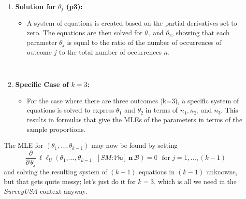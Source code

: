 \documentclass[12pt]{article}
\newcommand{\given}{\, | \,}
\renewcommand{\r}[1]{\text{#1}}
\begin{document}
\begin{itemize}
\begin{itemize}
\begin{itemize}
{\begin{enumerate}
    \begin{itemize}
        \item To find the MLEs, partial derivatives of the log-likelihood function with respect to each \( \theta_j \) are taken. This is done to find the points where the log-likelihood function is maximized.
        \item There is a constraint that all the probabilities \( \theta_j \) must sum to one. This constraint is incorporated into the optimization problem using a method such as Lagrange multipliers.
    \end{itemize}
    \\
    \item \textbf{Solution for \( \theta_j \) (p3):}
    \begin{itemize}
        \item A system of equations is created based on the partial derivatives set to zero. The equations are then solved for \( \theta_1 \) and \( \theta_2 \), showing that each parameter \( \theta_j \) is equal to the ratio of the number of occurrences of outcome \( j \) to the total number of occurrences \( n \).
    \end{itemize}
    \\
    \item \textbf{Specific Case of \( k=3 \):}
    \begin{itemize}
        \item For the case where there are three outcomes (k=3), a specific system of equations is solved to express \( \theta_1 \) and \( \theta_2 \) in terms of \( n_1, n_2 \), and \( n_3 \). This results in formulas that give the MLEs of the parameters in terms of the sample proportions.
    \end{itemize}
\end{enumerate}
}
\end{itemize}

The MLE for $( \theta_1, \dots, \theta_{ k - 1 } )$ may now be found by setting 
\begin{equation} \label{e:multinomial-7.1}
\frac{ \partial }{ \partial \, \theta_j } \, \ell \ell_U ( \theta_1, \dots, \theta_{ k - 1 } \given [ SM \! \! : \mathbb{ Mu } ] \, \bm{ n } \, \mathcal{ B } ) = 0
\ \ \ \r{for } j = 1, \dots, ( k - 1 )
\end{equation}
and solving the resulting system of $( k - 1 )$ equations in $( k - 1 )$ unknowns, but that gets quite messy; let's just do it for $k = 3$, which is all we need in the \textit{SurveyUSA} context anyway. 


\end{itemize}
\end{itemize}
\end{document}

